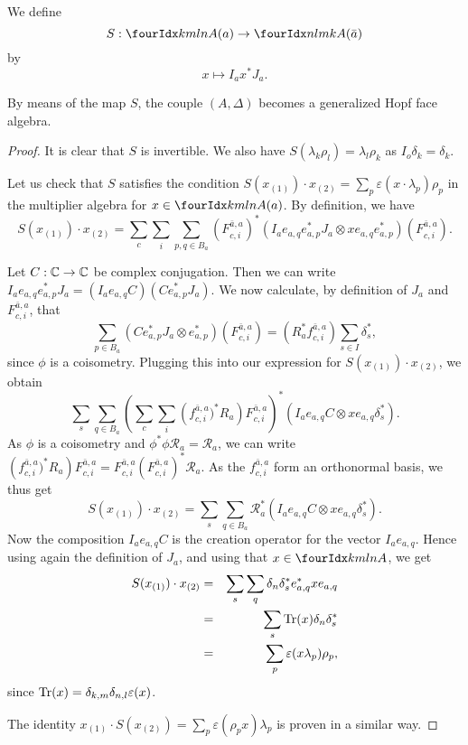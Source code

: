 We define \[S: \Gr{A}{k}{l}{m}{n}(a)\rightarrow \Gr{A}{n}{m}{l}{k}(\bar{a})\] by \[x \mapsto I_ax^*J_a.\]

\begin{Lem} By means of the map $S$, the couple $(A,\Delta)$ becomes a generalized Hopf face algebra.
\end{Lem}

\begin{proof} It is clear that $S$ is invertible. We also have $S(\lambda_k\rho_l) = \lambda_l\rho_k$ as $I_o\delta_k = \delta_k$.

Let us check that $S$ satisfies the condition $S(x_{(1)})\cdot x_{(2)} = \sum_p \varepsilon(x\cdot \lambda_p)\rho_p$ in the multiplier algebra for $x\in \Gr{A}{k}{l}{m}{n}(a)$. By definition, we have \[S(x_{(1)})\cdot x_{(2)} = \sum_{c}\sum_i\sum_{p,q\in B_a} \left(F_{c,i}^{\bar{a},a}\right)^*\left(I_ae_{a,q}e_{a,p}^*J_a\otimes xe_{a,q}e_{a,p}^*\right)\left(F_{c,i}^{\bar{a},a}\right).\]

Let $C:\mathbb{C}\rightarrow \mathbb{C}$ be complex conjugation. Then we can write $I_ae_{a,q}e_{a,p}^*J_a = (I_ae_{a,q}C)(Ce_{a,p}^*J_a)$. We now calculate, by definition of $J_a$ and $F_{c,i}^{\bar{a},a}$, that \[\sum_{p\in B_a} (Ce_{a,p}^*J_a\otimes e_{a,p}^*)\left(F_{c,i}^{\bar{a},a}\right) =  (R_a^*f_{c,i}^{\bar{a},a})\sum_{s\in I} \delta_s^*,\] since $\phi$ is a coisometry. Plugging this into our expression for $S(x_{(1)})\cdot x_{(2)}$, we obtain \[\sum_s\sum_{q\in B_a}\left(\sum_c\sum_i \left(f_{c,i}^{\bar{a},a})^*R_a\right) F_{c,i}^{\bar{a},a} \right)^* (I_ae_{a,q}C\otimes xe_{a,q}\delta_s^*).\] As $\phi$ is a coisometry and $\phi^*\phi \mathscr{R}_a = \mathscr{R}_a$, we can write $\left(f_{c,i}^{\bar{a},a})^*R_a\right) F_{c,i}^{\bar{a},a} = F_{c,i}^{\bar{a},a}(F_{c,i}^{\bar{a},a})^*\mathscr{R}_a$. As the $f_{c,i}^{\bar{a},a}$ form an orthonormal basis, we thus get \[S(x_{(1)})\cdot x_{(2)} = \sum_s\sum_{q\in B_a} \mathscr{R}_a^*(I_ae_{a,q}C\otimes xe_{a,q}\delta_s^*).\] Now the composition $I_ae_{a,q}C$ is the creation operator for the vector $I_ae_{a,q}$. Hence using again the definition of $J_a$, and using that $x\in \Gr{A}{k}{l}{m}{n}$, we get \begin{eqnarray*} S(x_{(1)})\cdot x_{(2)} &=& \sum_{s}\sum_q \delta_n\delta_s^* e_{a,q}^*xe_{a,q} \\ &=& \sum_s\mathrm{Tr}(x)\delta_n\delta_s^* \\ &=& \sum_p \varepsilon(x\lambda_p)\rho_p,\end{eqnarray*} since $\mathrm{Tr}(x) = \delta_{k,m}\delta_{n,l}\varepsilon(x)$.

The identity $x_{(1)}\cdot S(x_{(2)}) = \sum_p\varepsilon(\rho_px)\lambda_p$ is proven in a similar way.
\end{proof}

